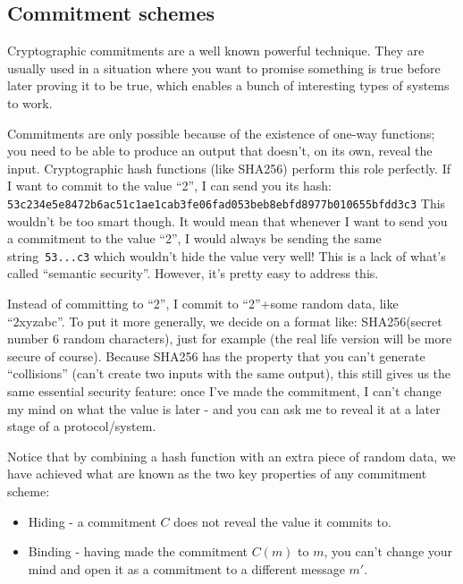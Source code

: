 \documentclass[10pt,a4paper]{article}
\providecommand{\tightlist}{%
  \setlength{\itemsep}{0pt}\setlength{\parskip}{0pt}}
\begin{document}
\hypertarget{commitment-schemes}{%
\subsection[Commitment
schemes]{\texorpdfstring{\protect\hypertarget{anchor-14}{}{}Commitment
schemes}{Commitment schemes}}\label{commitment-schemes}}

Cryptographic commitments are a well known powerful technique. They are
usually used in a situation where you want to promise something is true
before later proving it to be true, which enables a bunch of interesting
types of systems to work.

Commitments are only possible because of the existence of one-way
functions; you need to be able to produce an output that doesn't, on its own, reveal the input.
Cryptographic hash functions (like SHA256) perform this role perfectly. 
If I want to commit to the value ``2'', I can send you its hash:
\newline \newline
\texttt{53c234e5e8472b6ac51c1ae1cab3fe06fad053beb8ebfd8977b010655bfdd3c3}
\newline \newline
This wouldn't be too smart though. It would mean that whenever I want to send you a commitment to the value ``2'', 
I would always be sending the same string~\texttt{53...c3} 
which wouldn't hide the value very well! This is a lack of what's called ``semantic security''. 
However, it's pretty easy to address this.

Instead of committing to ``2'', I commit to ``2''+some random data, like
``2xyzabc''. To put it more generally, we decide on a format like: SHA256(secret number
\textbar{}\textbar{} 6 random characters), just for example (the real life version will be more secure of course). Because SHA256 has the property that you can't generate ``collisions'' (can't create two inputs with the same output), this still gives us the same essential security feature: once I've made the commitment, I can't change my mind on what the value is later - and you can ask me to reveal it at a later stage of a protocol/system.

Notice that by combining a hash function with an extra piece of random data, we have achieved what are known as the two key properties of any commitment scheme:

\begin{itemize}
\tightlist
\item
  Hiding - a commitment $C$ does not reveal the value it commits to.
\item
  Binding - having made the commitment $C(m)$ to $m$, you can't change your mind
  and open it as a commitment to a different message $m'$.
\end{itemize}
\end{document}
